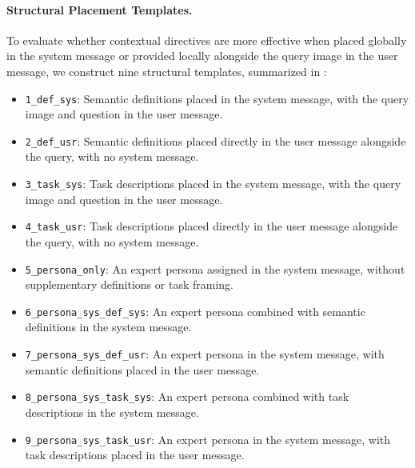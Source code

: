 \paragraph{Structural Placement Templates.}
To evaluate whether contextual directives are more effective when placed globally in the system message or provided locally alongside the query image in the user message, we construct nine structural templates, summarized in :
\begin{itemize}
    \item \texttt{1\_def\_sys}: Semantic definitions placed in the system message, with the query image and question in the user message.
    \item \texttt{2\_def\_usr}: Semantic definitions placed directly in the user message alongside the query, with no system message.
    \item \texttt{3\_task\_sys}: Task descriptions placed in the system message, with the query image and question in the user message.
    \item \texttt{4\_task\_usr}: Task descriptions placed directly in the user message alongside the query, with no system message.
    \item \texttt{5\_persona\_only}: An expert persona assigned in the system message, without supplementary definitions or task framing.
    \item \texttt{6\_persona\_sys\_def\_sys}: An expert persona combined with semantic definitions in the system message.
    \item \texttt{7\_persona\_sys\_def\_usr}: An expert persona in the system message, with semantic definitions placed in the user message.
    \item \texttt{8\_persona\_sys\_task\_sys}: An expert persona combined with task descriptions in the system message.
    \item \texttt{9\_persona\_sys\_task\_usr}: An expert persona in the system message, with task descriptions placed in the user message.
\end{itemize}

